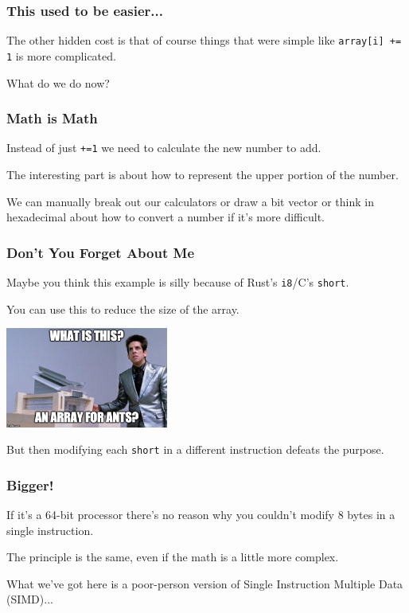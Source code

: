 \begin{frame}
\frametitle{This used to be easier...}

The other hidden cost is that of course things that were simple like \texttt{array[i] += 1} is more complicated. 

What do we do now?

\end{frame}


\begin{frame}
\frametitle{Math is Math}

Instead of just \texttt{+=1} we need to calculate the new number to add. 

The interesting part is about how to represent the upper portion of the number.

We can manually break out our calculators or draw a bit vector or think in hexadecimal about how to convert a number if it's more difficult.


\end{frame}

\begin{frame}
\frametitle{Don't You Forget About Me}

Maybe you think this example is silly because of  Rust's \texttt{i8}/C's \texttt{short}.

You can use this to reduce the size of the array.

\begin{center}
	\includegraphics[width=0.4\textwidth]{images/arrayforants.jpg}
\end{center}

But then modifying each \texttt{short} in a different instruction defeats the purpose.

\end{frame}


\begin{frame}
\frametitle{Bigger!}

If it's a 64-bit processor there's no reason why you couldn't modify 8 bytes in a single instruction. 

The principle is the same, even if the math is a little more complex.

What we've got here is a poor-person version of Single Instruction Multiple Data (SIMD)...

\end{frame}



